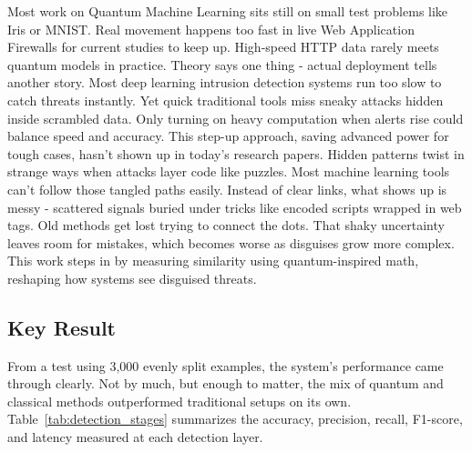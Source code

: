 \documentclass[journal,onecolumn]{IEEEtran}
\begin{document}
Most work on Quantum Machine Learning sits still on small test problems like Iris or MNIST. Real movement happens too fast in live Web Application Firewalls for current studies to keep up. High-speed HTTP data rarely meets quantum models in practice. Theory says one thing - actual deployment tells another story.
Most deep learning intrusion detection systems run too slow to catch threats instantly. Yet quick traditional tools miss sneaky attacks hidden inside scrambled data. Only turning on heavy computation when alerts rise could balance speed and accuracy. This step-up approach, saving advanced power for tough cases, hasn't shown up in today's research papers.
Hidden patterns twist in strange ways when attacks layer code like puzzles. Most machine learning tools can't follow those tangled paths easily. Instead of clear links, what shows up is messy - scattered signals buried under tricks like encoded scripts wrapped in web tags. Old methods get lost trying to connect the dots. That shaky uncertainty leaves room for mistakes, which becomes worse as disguises grow more complex. This work steps in by measuring similarity using quantum-inspired math, reshaping how systems see disguised threats.

\subsection{Key Result}
From a test using 3,000 evenly split examples, the system's performance came through clearly. Not by much, but enough to matter, the mix of quantum and classical methods outperformed traditional setups on its own. Table~\ref{tab:detection_stages} summarizes the accuracy, precision, recall, F1-score, and latency measured at each detection layer.

\begin{table}[h]
\centering
\caption{Performance Comparison Across Detection Stages}
\label{tab:detection_stages}
\footnotesize
\setlength{\tabcolsep}{3pt}
\renewcommand{\arraystretch}{1.1}

\end{table}
\end{document}
